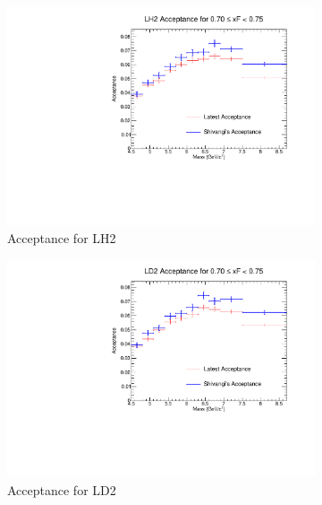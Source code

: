 \documentclass[11pt]{article}
\begin{document}
\begin{figure}[p]
    \centering
    \begin{subfigure}[b]{0.48\textwidth}
       \includegraphics[width=\linewidth]{./acceptancePlots/LH2_acceptance_xF_bin_14.pdf}
       \caption{Acceptance for LH2}
    \end{subfigure}\hfill
    \begin{subfigure}[b]{0.48\textwidth}
       \includegraphics[width=\linewidth]{./acceptancePlots/LD2_acceptance_xF_bin_14.pdf}
       \caption{Acceptance for LD2}
    \end{subfigure}
    \begin{subfigure}[b]{0.48\textwidth}

\end{subfigure}
\end{figure}
\end{document}
